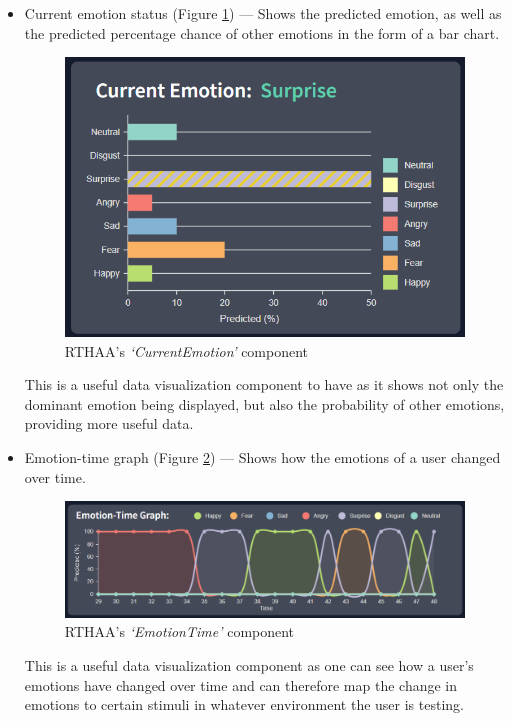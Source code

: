 \documentclass[12pt, a4paper]{article}
\begin{document}
\begin{itemize}
    \item Current emotion status (Figure \ref{fig:uic-bar}) --- Shows the predicted emotion, as well as the predicted percentage chance of other emotions in the form of a bar chart. 
    \begin{figure}[H]
        \centering
        \includegraphics[scale=0.80]{images/uic-bar.png}
        \caption{RTHAA's \textit{`CurrentEmotion'} component}
        \label{fig:uic-bar}
    \end{figure}
    This is a useful data visualization component to have as it shows not only the dominant emotion being displayed, but also the probability of other emotions, providing more useful data.

    \item Emotion-time graph (Figure \ref{fig:uic-graph}) --- Shows how the emotions of a user changed over time.
    \begin{figure}[H]
        \centering
        \includegraphics[scale=0.70]{images/uic-graph.png}
        \caption{RTHAA's \textit{`EmotionTime'} component}
        \label{fig:uic-graph}
    \end{figure}

    This is a useful data visualization component as one can see how a user's emotions have changed over time and can therefore map the change in emotions to certain stimuli in whatever environment the user is testing.


\end{itemize}
\end{document}
